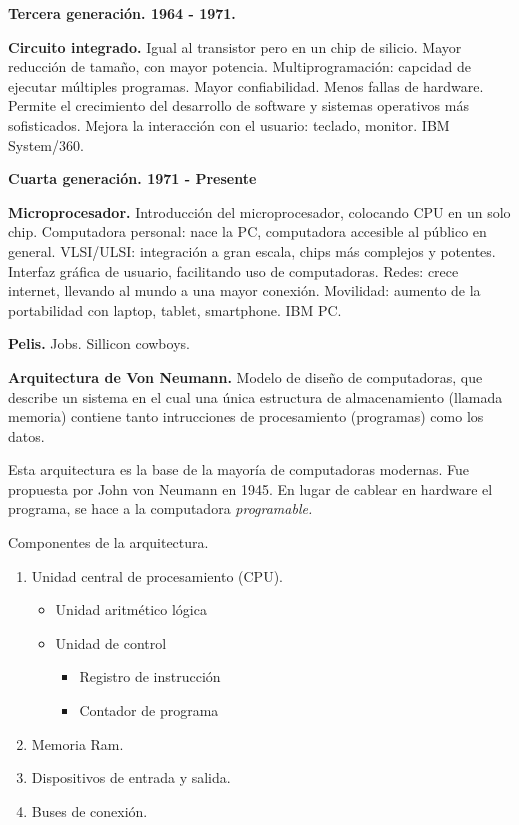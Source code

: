 \documentclass{article}
\begin{document}
\textbf{Tercera generación. 1964 - 1971.}

\textbf{Circuito integrado.} Igual al transistor pero en un chip de silicio.
Mayor reducción de tamaño, con mayor potencia. Multiprogramación: capcidad de
ejecutar múltiples programas. Mayor confiabilidad. Menos fallas de hardware. 
Permite el crecimiento del desarrollo de software y sistemas operativos más 
sofisticados. Mejora la interacción con el usuario: teclado, monitor. 
IBM System/360.

\textbf{Cuarta generación. 1971 - Presente}

\textbf{Microprocesador.} Introducción del microprocesador, colocando CPU en 
un solo chip. Computadora personal: nace la PC, computadora accesible al 
público en general. VLSI/ULSI: integración a gran escala, chips más complejos
y potentes. Interfaz gráfica de usuario, facilitando uso de computadoras. 
Redes: crece internet, llevando al mundo a una mayor conexión. Movilidad: 
aumento de la portabilidad con laptop, tablet, smartphone. IBM PC.

\textbf{Pelis.} Jobs. Sillicon cowboys.

\textbf{Arquitectura de Von Neumann.} Modelo de diseño de computadoras, que 
describe un sistema en el cual una única estructura de almacenamiento (llamada
memoria) contiene tanto intrucciones de procesamiento (programas) como los 
datos.

Esta arquitectura es la base de la mayoría de computadoras modernas. Fue 
propuesta por John von Neumann en 1945. En lugar de cablear en hardware el 
programa, se hace a la computadora \textit{programable.}

Componentes de la arquitectura. 

\begin{enumerate}
    \item Unidad central de procesamiento (CPU).
     \begin{itemize}
        \item Unidad aritmético lógica
        \item Unidad de control
        \begin{itemize}
            \item Registro de instrucción
            \item Contador de programa
        \end{itemize}
     \end{itemize}
    \item Memoria Ram. 
    \item Dispositivos de entrada y salida. 
    \item Buses de conexión.
\end{enumerate}
\end{document}
